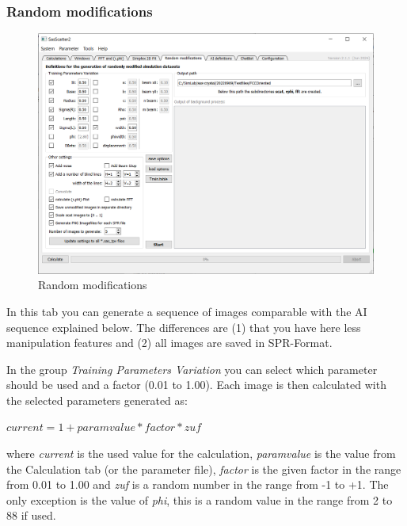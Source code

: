 \documentclass[11pt]{article} %
\begin{document}
\subsubsection{Random modifications}
\begin{figure}[H]
 \centering
 \includegraphics[width=\textwidth]{gui-tpv.png}
 \caption{Random modifications}
\end{figure}

In this tab you can generate a sequence of images comparable with the AI sequence explained below. The differences are (1) that you have here less manipulation features and (2) all images are saved in SPR-Format.

In the group {\it Training Parameters Variation} you can select which parameter should be used and a factor (0.01 to 1.00). Each image is then calculated with the selected parameters generated as: \\
\centerline{$current = 1 + paramvalue * factor * zuf$}
where {\it current} is the used value for the calculation, {\it paramvalue} is the value from the Calculation tab (or the parameter file), {\it factor} is the given factor in the range from 0.01 to 1.00 and {\it zuf} is a random number in the range from -1 to +1. The only exception is the value of {\it phi}, this is a random value in the range from 2 to 88 if used.
\end{document}
